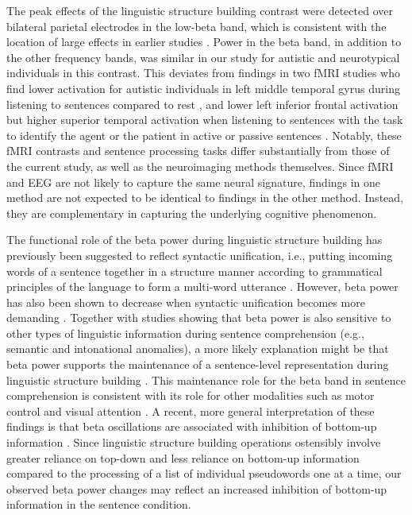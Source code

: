 The peak effects of the linguistic structure building contrast were detected over bilateral parietal electrodes in the low-beta band, which is consistent with the location of large effects in earlier studies \citep{bastiaansen2010,bastiaansen2015}. Power in the beta band, in addition to the other frequency bands, was similar in our study for autistic and neurotypical individuals in this contrast. This deviates from findings in two fMRI studies who find lower activation for autistic individuals in left middle temporal gyrus during listening to sentences compared to rest \citep{muller1999}, and lower left inferior frontal activation but higher superior temporal activation when listening to sentences with the task to identify the agent or the patient in active or passive sentences \citep{just2004}. Notably, these fMRI contrasts and sentence processing tasks differ substantially from those of the current study, as well as the neuroimaging methods themselves. Since fMRI and EEG are not likely to capture the same neural signature, findings in one method are not expected to be identical to findings in the other method. Instead, they are complementary in capturing the underlying cognitive phenomenon.

The functional role of the beta power during linguistic structure building has previously been suggested to reflect syntactic unification, i.e., putting incoming words of a sentence together in a structure manner according to grammatical principles of the language to form a multi-word utterance \citep{bastiaansen2010,bastiaansen2015}. However, beta power has also been shown to decrease when syntactic unification becomes more demanding \citep{lewis2023}. Together with studies showing that beta power is also sensitive to other types of linguistic information during sentence comprehension (e.g., semantic and intonational anomalies), a more likely explanation might be that beta power supports the maintenance of a sentence-level representation during linguistic structure building \citep{lewis2016}. This maintenance role for the beta band in sentence comprehension is consistent with its role for other modalities such as motor control and visual attention \citep{engel2010}. A recent, more general interpretation of these findings is that beta oscillations are associated with inhibition of bottom-up information \citep{limanowski2020,miller2018}. Since linguistic structure building operations ostensibly involve greater reliance on top-down and less reliance on bottom-up information compared to the processing of a list of individual pseudowords one at a time, our observed beta power changes may reflect an increased inhibition of bottom-up information in the sentence condition.

